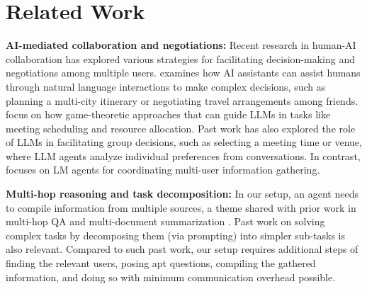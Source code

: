\section{Related Work}


\textbf{AI-mediated collaboration and negotiations:}
Recent research in human-AI collaboration has explored various strategies for facilitating decision-making and negotiations among multiple users. \citet{lin2024decision} examines how AI assistants can assist humans through natural language interactions to make complex decisions, such as planning a multi-city itinerary or negotiating travel arrangements among friends. %
\citet{gemp2024states} focus on how game-theoretic approaches that can guide LLMs in tasks like meeting scheduling and resource allocation. %
Past work \cite{papachristou2023leveraging} has also explored the role of LLMs in facilitating group decisions, such as selecting a meeting time or venue, where LLM agents analyze individual preferences from conversations. %
In contrast, \asyncfw{} focuses on LM agents for coordinating multi-user information gathering.

\textbf{Multi-hop reasoning and task decomposition:}
In our setup, an agent needs to compile information from multiple sources, a theme shared with prior work in multi-hop QA \cite{welbl2018constructing, yang2018hotpotqa} and multi-document summarization \cite{liu2018generating,fabbri2019multi}. %
Past work on solving complex tasks by decomposing them (via prompting) into simpler sub-tasks \cite{wolfson2020break, khotdecomposed, jhamtani2023natural} is also relevant.
Compared to such past work, our setup requires additional steps of finding the relevant users, posing apt questions, compiling the gathered information, and doing so with minimum communication overhead possible.


